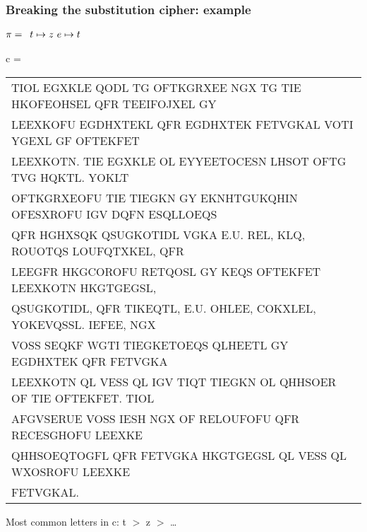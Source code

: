 \documentclass[aspectratio=169, lualatex, handout, 10pt,dvipsnames,svgnames]{beamer} %
\def\enbleu#1{\textcolor{bleu}{#1}}
\def\enrouge#1{\textcolor{rouge}{#1}}
\begin{document}
\begin{frame}
  \frametitle{Breaking the substitution cipher: example}

    \enrouge{
    \tiny{$\pi=
      \begin{array}[t]{l}
      t\mapsto z\ e\mapsto t\
      \end{array}
      $}}
  \vspace{0.25cm}
  
  \color{vert}
  \tiny{c =
    \begin{tabular}[t]{l}
      \enbleu{T}IOL EGXKL\enbleu{E} QODL \enbleu{T}G OF\enbleu{T}KGRXE\enbleu{E} NGX \enbleu{T}G \enbleu{T}I\enbleu{E} HKOFEOHS\enbleu{E}L QFR \enbleu{T}\enbleu{E}EIFOJX\enbleu{E}L GY \\
      L\enbleu{E}EXKOFU EGDHX\enbleu{T}\enbleu{E}KL QFR EGDHX\enbleu{T}\enbleu{E}K F\enbleu{E}\enbleu{T}VGKAL VO\enbleu{T}I YGEXL GF OF\enbleu{T}\enbleu{E}KF\enbleu{E}\enbleu{T} \\
      L\enbleu{E}EXKO\enbleu{T}N. \enbleu{T}I\enbleu{E} EGXKL\enbleu{E} OL \enbleu{E}YY\enbleu{E}E\enbleu{T}OC\enbleu{E}SN LHSO\enbleu{T} OF\enbleu{T}G \enbleu{T}VG HQK\enbleu{T}L. YOKL\enbleu{T} \\
      OF\enbleu{T}KGRXEOFU \enbleu{T}I\enbleu{E} \enbleu{T}I\enbleu{E}GKN GY EKNH\enbleu{T}GUKQHIN OFESXROFU IGV DQFN ESQLLOEQS \\
      QFR HGHXSQK QSUGKO\enbleu{T}IDL VGKA \enbleu{E}.U. R\enbleu{E}L, KLQ, ROUO\enbleu{T}QS LOUFQ\enbleu{T}XK\enbleu{E}L, QFR \\
      L\enbleu{E}EGFR HKGCOROFU R\enbleu{E}\enbleu{T}QOSL GY K\enbleu{E}QS OF\enbleu{T}\enbleu{E}KF\enbleu{E}\enbleu{T} L\enbleu{E}EXKO\enbleu{T}N HKG\enbleu{T}GEGSL, \\
      QSUGKO\enbleu{T}IDL, QFR \enbleu{T}IK\enbleu{E}Q\enbleu{T}L, \enbleu{E}.U. OHL\enbleu{E}E, COKXL\enbleu{E}L, YOK\enbleu{E}VQSSL. I\enbleu{E}FE\enbleu{E}, NGX \\
      VOSS S\enbleu{E}QKF WG\enbleu{T}I \enbleu{T}I\enbleu{E}GK\enbleu{E}\enbleu{T}OEQS QLH\enbleu{E}E\enbleu{T}L GY EGDHX\enbleu{T}\enbleu{E}K QFR F\enbleu{E}\enbleu{T}VGKA \\
      L\enbleu{E}EXKO\enbleu{T}N QL V\enbleu{E}SS QL IGV \enbleu{T}IQ\enbleu{T} \enbleu{T}I\enbleu{E}GKN OL QHHSO\enbleu{E}R OF \enbleu{T}I\enbleu{E} OF\enbleu{T}\enbleu{E}KF\enbleu{E}\enbleu{T}. \enbleu{T}IOL \\
      AFGVS\enbleu{E}RU\enbleu{E} VOSS I\enbleu{E}SH NGX OF R\enbleu{E}LOUFOFU QFR R\enbleu{E}C\enbleu{E}SGHOFU L\enbleu{E}EXK\enbleu{E} \\
      QHHSOEQ\enbleu{T}OGFL QFR F\enbleu{E}\enbleu{T}VGKA HKG\enbleu{T}GEGSL QL V\enbleu{E}SS QL WXOSROFU L\enbleu{E}EXK\enbleu{E} \\
      F\enbleu{E}\enbleu{T}VGKAL.
    \end{tabular}
  }
  \vspace{0.5cm}

  \normalsize
  \color{black}Most common letters in c: t $>$ z $>$ \dots
  
  \color{black}
\end{frame}
\end{document}
